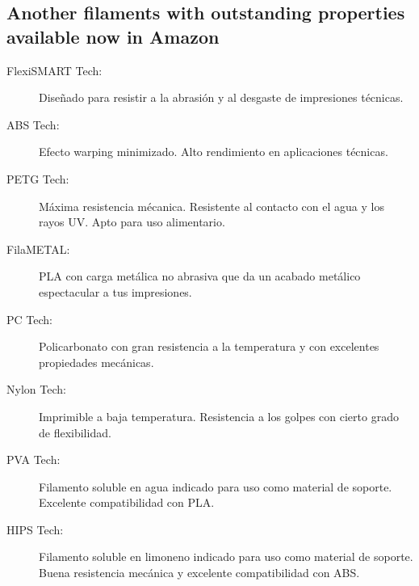 \documentclass[11pt,a4paper]{article}
\begin{document}
\subsection{Another filaments with outstanding properties available now in Amazon}
\begin{description}
\item[FlexiSMART Tech:] Diseñado para resistir a la abrasión y al desgaste de impresiones técnicas.
\item[ABS Tech:] Efecto warping minimizado. Alto rendimiento en aplicaciones técnicas.
\item[PETG Tech:] Máxima resistencia mécanica. Resistente al contacto con el agua y los rayos UV. Apto para uso alimentario.
\item[FilaMETAL:] PLA con carga metálica no abrasiva que da un acabado metálico espectacular a tus impresiones.
\item[PC Tech:] Policarbonato con gran resistencia a la temperatura y con excelentes propiedades mecánicas.
\item[Nylon Tech:] Imprimible a baja temperatura. Resistencia a los golpes con cierto grado de flexibilidad.
\item[PVA Tech:] Filamento soluble en agua indicado para uso como material de soporte. Excelente compatibilidad con PLA.
\item[HIPS Tech:] Filamento soluble en limoneno indicado para uso como material de soporte. Buena resistencia mecánica y excelente compatibilidad con ABS.
\end{description}

\end{document}

